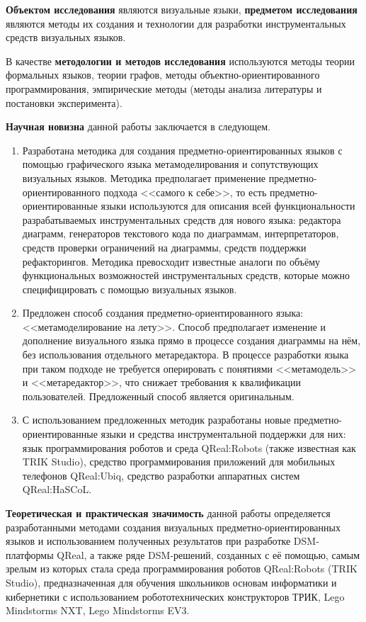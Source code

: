 \textbf{Объектом исследования} являются визуальные языки, \textbf{предметом исследования} 
являются методы их создания и технологии для разработки инструментальных средств визуальных языков.

В качестве \textbf{методологии и методов исследования} используются методы теории 
формальных языков, теории графов, методы объектно-ориентированного программирования,
эмпирические методы (методы анализа литературы и постановки эксперимента).

\textbf{Научная новизна} данной работы заключается в следующем.
\begin{enumerate}
	\item Разработана методика для создания предметно-ориентированных языков с помощью 
		графического языка метамоделирования и сопутствующих визуальных языков. Методика 
		предполагает применение предметно-ориентированного подхода <<самого к себе>>, то есть
		предметно-ориентированные языки используются для описания всей функциональности 
		разрабатываемых инструментальных средств для нового языка: редактора диаграмм, 
		генераторов текстового кода по диаграммам, интерпретаторов, средств проверки ограничений 
		на диаграммы, средств поддержки рефакторингов. Методика превосходит известные аналоги 
		по объёму функциональных возможностей инструментальных средств, которые можно 
		специфицировать с помощью визуальных языков.
	\item Предложен способ создания предметно-ориентированного языка: <<метамоделирование на лету>>. 
		Способ предполагает изменение и дополнение визуального языка прямо в процессе создания диаграммы на нём,
		без использования отдельного метаредактора. В процессе разработки языка при таком подходе
		не требуется оперировать с понятиями <<метамодель>> и <<метаредактор>>, что снижает 
		требования к квалификации пользователей. Предложенный способ является оригинальным.
	\item С использованием предложенных методик разработаны новые предметно-ориентированные языки и
		средства инструментальной поддержки для них: язык программирования роботов и среда QReal:Robots
		(также известная как TRIK Studio), средство программирования приложений для мобильных телефонов 
		QReal:Ubiq, средство разработки аппаратных систем QReal:HaSCoL.
\end{enumerate}

\textbf{Теоретическая и практическая значимость} данной работы определяется разработанными 
методами создания визуальных предметно-ориентированных языков и использованием полученных 
результатов при разработке DSM-платформы QReal, а также ряде DSM-решений, созданных с её помощью, 
самым зрелым из которых стала среда программирования роботов QReal:Robots (TRIK Studio), 
предназначенная для обучения школьников основам информатики и кибернетики с использованием робототехнических 
конструкторов ТРИК, Lego Mindstorms NXT, Lego Mindstorms EV3.

